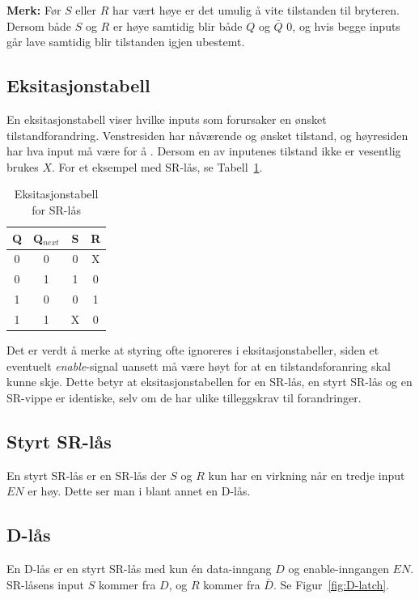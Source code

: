 \documentclass[12pt,a4paper,norsk]{article}
\begin{document}
\textbf{Merk:} Før $S$ eller $R$ har vært høye er det umulig å vite tilstanden til bryteren.
Dersom både $S$ og $R$ er høye samtidig blir både $Q$ og $\bar{Q}$ $0$, og hvis begge
inputs går lave samtidig blir tilstanden igjen ubestemt.

\subsection{Eksitasjonstabell}
En eksitasjonstabell viser hvilke inputs som forursaker en ønsket
tilstandforandring. Venstresiden har nåværende og ønsket tilstand, og høyresiden
har hva input må være for å . Dersom en av inputenes tilstand ikke er vesentlig brukes $X$. For
et eksempel med SR-lås, se Tabell~\ref{tab:SR_latch_eksit}.

\begin{table}[hbt!]
  \centering
  \begin{tabular}{cc|cc}
    \toprule
    Q & Q$_{next}$ & S & R \\
    \midrule
    0 & 0 & 0 & X \\
    0 & 1 & 1 & 0 \\
    1 & 0 & 0 & 1 \\
    1 & 1 & X & 0
  \end{tabular}
  \caption{Eksitasjonstabell for SR-lås\label{tab:SR_latch_eksit}}
\end{table}

Det er verdt å merke at styring ofte ignoreres i eksitasjonstabeller, siden et
eventuelt \textit{enable}-signal uansett må være høyt for at en
tilstandsforanring skal kunne skje. Dette betyr at eksitasjonstabellen for en
SR-lås, en styrt SR-lås og en SR-vippe er identiske, selv om de har ulike
tilleggskrav til forandringer. 

\subsection{Styrt SR-lås}
En styrt SR-lås er en SR-lås der $S$ og $R$ kun har en virkning når en tredje
input $EN$ er høy. Dette ser man i blant annet en D-lås.

\subsection{D-lås}
En D-lås er en styrt SR-lås med kun én data-inngang $D$ og enable-inngangen
$EN$. SR-låsens input $S$ kommer fra $D$, og $R$ kommer
fra $\bar{D}$. Se Figur~\ref{fig:D-latch}.
\end{document}
